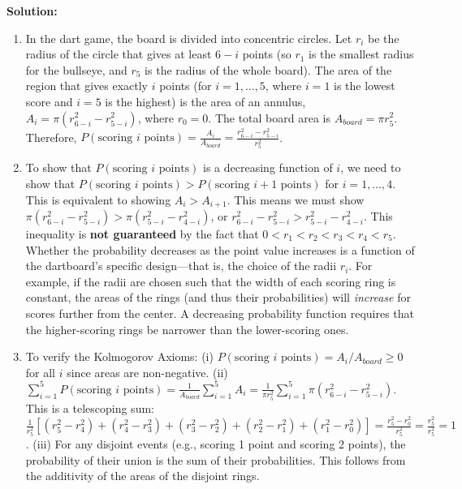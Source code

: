 \noindent\textbf{Solution:}
\begin{enumerate}[label=(\alph*)]
    \item In the dart game, the board is divided into concentric circles. Let $r_i$ be the radius of the circle that gives at least $6-i$ points (so $r_1$ is the smallest radius for the bullseye, and $r_5$ is the radius of the whole board). The area of the region that gives exactly $i$ points (for $i=1, \ldots, 5$, where $i=1$ is the lowest score and $i=5$ is the highest) is the area of an annulus, $A_i = \pi(r_{6-i}^2 - r_{5-i}^2)$, where $r_0 = 0$.
    \vspace{1ex} %
    The total board area is $A_{board} = \pi r_5^2$.
    \vspace{1ex} %
    Therefore, $P(\text{scoring } i \text{ points}) = \frac{A_i}{A_{board}} = \frac{r_{6-i}^2 - r_{5-i}^2}{r_5^2}$.
    \vspace{1ex} %
    \item To show that $P(\text{scoring } i \text{ points})$ is a decreasing function of $i$, we need to show that $P(\text{scoring } i \text{ points}) > P(\text{scoring } i+1 \text{ points})$ for $i=1, \ldots, 4$. This is equivalent to showing $A_i > A_{i+1}$.
    \vspace{1ex} %
    This means we must show $\pi(r_{6-i}^2 - r_{5-i}^2) > \pi(r_{5-i}^2 - r_{4-i}^2)$, or $r_{6-i}^2 - r_{5-i}^2 > r_{5-i}^2 - r_{4-i}^2$.
    \vspace{1ex} %
    This inequality is \textbf{not guaranteed} by the fact that $0 < r_1 < r_2 < r_3 < r_4 < r_5$. Whether the probability decreases as the point value increases is a function of the dartboard's specific design---that is, the choice of the radii $r_i$. For example, if the radii are chosen such that the width of each scoring ring is constant, the areas of the rings (and thus their probabilities) will \textit{increase} for scores further from the center. A decreasing probability function requires that the higher-scoring rings be narrower than the lower-scoring ones.
    \vspace{1ex} %
    \item To verify the Kolmogorov Axioms:
    \vspace{1ex} %
    (i) $P(\text{scoring } i \text{ points}) = A_i/A_{board} \geq 0$ for all $i$ since areas are non-negative.
    \vspace{1ex} %
    (ii) $\sum_{i=1}^5 P(\text{scoring } i \text{ points}) = \frac{1}{A_{board}} \sum_{i=1}^5 A_i = \frac{1}{\pi r_5^2} \sum_{i=1}^5 \pi(r_{6-i}^2 - r_{5-i}^2)$. This is a telescoping sum:
    \vspace{1ex} %
    $\frac{1}{r_5^2} [ (r_5^2-r_4^2) + (r_4^2-r_3^2) + (r_3^2-r_2^2) + (r_2^2-r_1^2) + (r_1^2-r_0^2) ] = \frac{r_5^2 - r_0^2}{r_5^2} = \frac{r_5^2}{r_5^2} = 1$.
    \vspace{1ex} %
    (iii) For any disjoint events (e.g., scoring 1 point and scoring 2 points), the probability of their union is the sum of their probabilities. This follows from the additivity of the areas of the disjoint rings.
\end{enumerate}



